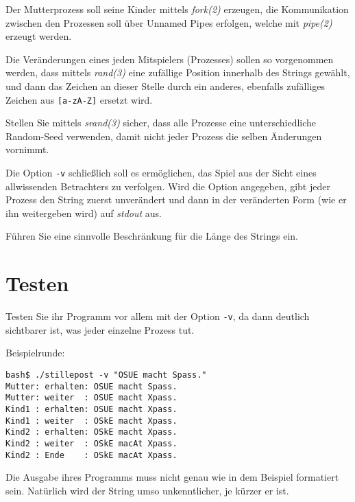 Der Mutterprozess soll seine Kinder mittels \emph{fork(2)} erzeugen,
die Kommunikation zwischen den Prozessen soll über Unnamed Pipes
erfolgen, welche mit \emph{pipe(2)} erzeugt werden.

Die Veränderungen eines jeden Mitspielers (Prozesses) sollen so
vorgenommen werden, dass mittels \emph{rand(3)} eine zufällige
Position innerhalb des Strings gewählt, und dann das Zeichen an
dieser Stelle durch ein anderes, ebenfalls zufälliges Zeichen aus
{\tt [a-zA-Z]} ersetzt wird.

Stellen Sie mittels \emph{srand(3)} sicher, dass alle Prozesse eine
unterschiedliche Random-Seed verwenden, damit nicht jeder Prozess die
selben Änderungen vornimmt.

Die Option {\tt -v} schließlich soll es ermöglichen, das Spiel aus
der Sicht eines allwissenden Betrachters zu verfolgen. Wird die Option
angegeben, gibt jeder Prozess den String zuerst unverändert und dann
in der veränderten Form (wie er ihn weitergeben wird) auf
\emph{stdout} aus.

Führen Sie eine sinnvolle Beschränkung für die Länge des Strings
ein.

\section*{Testen}

Testen Sie ihr Programm vor allem mit der Option {\tt -v}, da dann
deutlich sichtbarer ist, was jeder einzelne Prozess tut.

Beispielrunde:
\begin{verbatim}
bash$ ./stillepost -v "OSUE macht Spass."
Mutter: erhalten: OSUE macht Spass.
Mutter: weiter  : OSUE macht Xpass.
Kind1 : erhalten: OSUE macht Xpass.
Kind1 : weiter  : OSkE macht Xpass.
Kind2 : erhalten: OSkE macht Xpass.
Kind2 : weiter  : OSkE macAt Xpass.
Kind2 : Ende    : OSkE macAt Xpass.
\end{verbatim}

Die Ausgabe ihres Programms muss nicht genau wie in dem Beispiel
formatiert sein. Natürlich wird der String umso unkenntlicher, je
kürzer er ist.

\osueguidelinestwo



